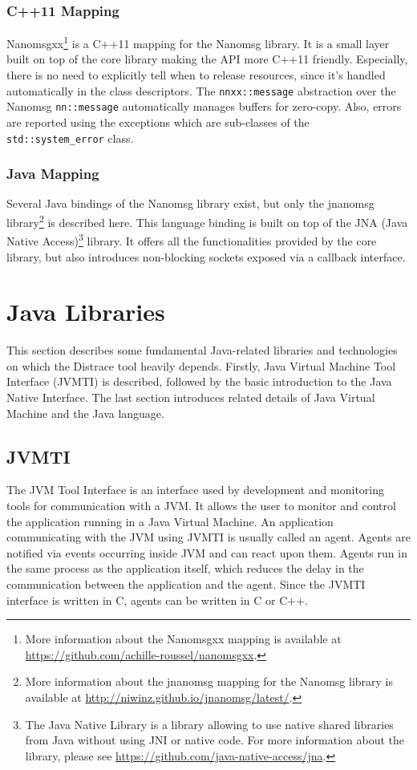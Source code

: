 \subsubsection{C++11 Mapping}
Nanomsgxx\footnote{More information about the Nanomsgxx mapping is available at \url{https://github.com/achille-roussel/nanomsgxx}.} is a C++11 mapping for the Nanomsg library. It is a small layer built on top of the core library making the API more C++11  friendly. Especially, there is no need to explicitly tell when to release resources, since it's handled automatically in the class descriptors. The \texttt{nnxx::message} abstraction over the Nanomsg \texttt{nn::message} automatically manages buffers for zero-copy. Also, errors are reported using the exceptions which are sub-classes of the \texttt{std::system\_error} class.
\subsubsection{Java Mapping}
Several Java bindings of the Nanomsg library exist, but only the jnanomsg library\footnote{More information about the jnanomsg mapping for the Nanomsg library is available at \url{http://niwinz.github.io/jnanomsg/latest/}.}  is described here. This language binding is built on top of the JNA (Java Native Access)\footnote{The Java Native Library is a library allowing to use native shared libraries from Java without using JNI or native code. For more information about the library, please see \url{https://github.com/java-native-access/jna}.} library. It offers all the functionalities provided by the core library, but also introduces non-blocking sockets exposed via a callback interface.

\section{Java Libraries}
This section describes some fundamental Java-related libraries and technologies on which the Distrace tool heavily depends. Firstly, Java Virtual Machine Tool Interface (JVMTI) is described, followed by the basic introduction to the Java Native Interface. The last section introduces related details of Java Virtual Machine and the Java language.
\subsection{JVMTI}
\label{JVMTI}
The JVM Tool Interface is an interface used by development and monitoring tools for communication with a JVM. It allows the user to monitor and control the application running in a Java Virtual Machine. An application communicating with the JVM using JVMTI is usually called an agent. Agents are notified via events occurring inside JVM and can react upon them. Agents run in the same process as the application itself, which reduces the delay in the communication between the application and the agent. Since the JVMTI interface is written in C, agents can be written in C or C++. 

